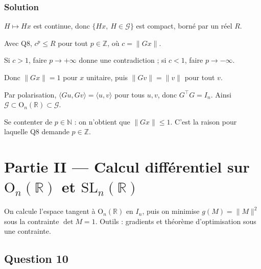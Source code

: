 \documentclass[11pt,a4paper]{article}
\newcommand{\equationajustee}[1]{%
  \sbox{\boiteequation}{$\displaystyle #1$}%
  \ifdim\wd\boiteequation>\linewidth
    \[\resizebox{\linewidth}{!}{\usebox{\boiteequation}}\]%
  \else
    \[#1\]%
  \fi}
\begin{document}
\hypertarget{solution-8}{%
\subsubsection{Solution}\label{solution-8}}

\(H\mapsto Hx\) est continue, donc \(\{Hx,\ H\in\mathcal G\}\) est compact, borné par un réel \(R\).

Avec Q8, \(c^p\le R\) pour tout \(p\in\mathbb Z\), où \(c=\|Gx\|\).

Si \(c>1\), faire \(p\to+\infty\) donne une contradiction ; si \(c<1\), faire \(p\to-\infty\).

Donc \(\|Gx\|=1\) pour \(x\) unitaire, puis \(\|Gv\|=\|v\|\) pour tout \(v\).

Par polarisation, \(\langle Gu,Gv\rangle=\langle u,v\rangle\) pour tous \(u,v\), donc \(G^\top G=I_n\). Ainsi \(\mathcal G\subset{\mathrm{O}}_n(\mathbb R)\subset\mathcal G\).

\equationajustee{\boxed{\mathcal G={\mathrm{O}}_n(\mathbb R)}}

\begin{piege}

Se contenter de \(p\in\mathbb N\) : on n'obtient que \(\|Gx\|\le1\). C'est la raison pour laquelle Q8 demande \(p\in\mathbb Z\).

\end{piege}

\hypertarget{partie-ii-calcul-diffuxe9rentiel-sur-mathrmo_nmathbb-r-et-mathrmsl_nmathbb-r}{%
\section{\texorpdfstring{Partie II --- Calcul différentiel sur \({\mathrm{O}}_n(\mathbb R)\) et \({\mathrm{SL}}_n(\mathbb R)\)}{Partie II --- Calcul différentiel sur \{\textbackslash mathrm\{O\}\}\_n(\textbackslash mathbb R) et \{\textbackslash mathrm\{SL\}\}\_n(\textbackslash mathbb R)}}\label{partie-ii-calcul-diffuxe9rentiel-sur-mathrmo_nmathbb-r-et-mathrmsl_nmathbb-r}}

On calcule l'espace tangent à \({\mathrm{O}}_n(\mathbb R)\) en \(I_n\), puis on minimise \(g(M)=\|M\|^2\) sous la contrainte \(\det M=1\). Outils : gradients et théorème d'optimisation sous une contrainte.

\hypertarget{question-10}{%
\subsection{Question 10}\label{question-10}}
\end{document}
